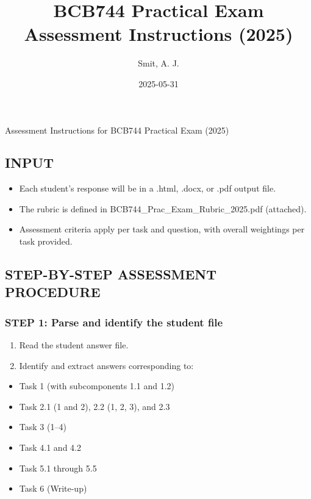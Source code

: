\documentclass[
  10pt,
]{article}
\title{BCB744 Practical Exam Assessment Instructions (2025)}
\author{Smit, A. J.}
\date{2025-05-31}
\providecommand{\tightlist}{%
  \setlength{\itemsep}{0pt}\setlength{\parskip}{0pt}}
\begin{document}
\maketitle


Assessment Instructions for BCB744 Practical Exam (2025)

\subsection{INPUT}\label{input}

\begin{itemize}
\tightlist
\item
  Each student's response will be in a .html, .docx, or .pdf output
  file.
\item
  The rubric is defined in BCB744\_Prac\_Exam\_Rubric\_2025.pdf
  (attached).
\item
  Assessment criteria apply per task and question, with overall
  weightings per task provided.
\end{itemize}

\subsection{STEP-BY-STEP ASSESSMENT
PROCEDURE}\label{step-by-step-assessment-procedure}

\subsubsection{STEP 1: Parse and identify the student
file}\label{step-1-parse-and-identify-the-student-file}

\begin{enumerate}
\def\labelenumi{\arabic{enumi}.}
\tightlist
\item
  Read the student answer file.
\item
  Identify and extract answers corresponding to:
\end{enumerate}

\begin{itemize}
\tightlist
\item
  Task 1 (with subcomponents 1.1 and 1.2)
\item
  Task 2.1 (1 and 2), 2.2 (1, 2, 3), and 2.3
\item
  Task 3 (1--4)
\item
  Task 4.1 and 4.2
\item
  Task 5.1 through 5.5
\item
  Task 6 (Write-up)
\end{itemize}
\end{document}
